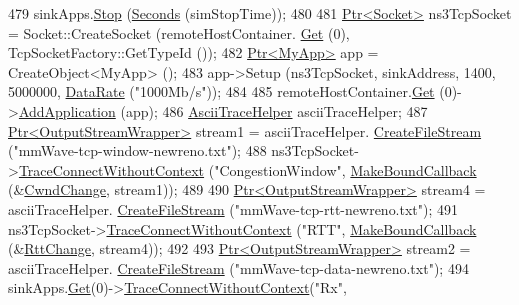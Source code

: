 \begin{DoxyCode}
479         sinkApps.\hyperlink{classns3_1_1ApplicationContainer_adfc52f9aa4020c8714679b00bbb9ddb3}{Stop} (\hyperlink{group__timecivil_ga33c34b816f8ff6628e33d5c8e9713b9e}{Seconds} (simStopTime));
480 
481         \hyperlink{classns3_1_1Ptr}{Ptr<Socket>} ns3TcpSocket = Socket::CreateSocket (remoteHostContainer.
      \hyperlink{classns3_1_1NodeContainer_a9ed96e2ecc22e0f5a3d4842eb9bf90bf}{Get} (0), TcpSocketFactory::GetTypeId ());
482         \hyperlink{classns3_1_1Ptr}{Ptr<MyApp>} app = CreateObject<MyApp> ();
483         app->Setup (ns3TcpSocket, sinkAddress, 1400, 5000000, \hyperlink{classns3_1_1DataRate}{DataRate} (\textcolor{stringliteral}{"1000Mb/s"}));
484 
485         remoteHostContainer.\hyperlink{classns3_1_1NodeContainer_a9ed96e2ecc22e0f5a3d4842eb9bf90bf}{Get} (0)->\hyperlink{classns3_1_1Node_ab98b4fdc4aadc86366b80e8a79a53f47}{AddApplication} (app);
486         \hyperlink{classns3_1_1AsciiTraceHelper}{AsciiTraceHelper} asciiTraceHelper;
487         \hyperlink{classns3_1_1Ptr}{Ptr<OutputStreamWrapper>} stream1 = asciiTraceHelper.
      \hyperlink{classns3_1_1AsciiTraceHelper_a44960bf2ca32835024eaedd26d1c4f94}{CreateFileStream} (\textcolor{stringliteral}{"mmWave-tcp-window-newreno.txt"});
488         ns3TcpSocket->\hyperlink{classns3_1_1ObjectBase_a1be45f6fd561e75dcac9dfa81b2b81e4}{TraceConnectWithoutContext} (\textcolor{stringliteral}{"CongestionWindow"}, 
      \hyperlink{group__makeboundcallback_ga1725d6362e6065faa0709f7c93f8d770}{MakeBoundCallback} (&\hyperlink{mmwave-tcp-building-example_8cc_a029700a26394b63e7e4f8fe0dc2a3e0d}{CwndChange}, stream1));
489 
490         \hyperlink{classns3_1_1Ptr}{Ptr<OutputStreamWrapper>} stream4 = asciiTraceHelper.
      \hyperlink{classns3_1_1AsciiTraceHelper_a44960bf2ca32835024eaedd26d1c4f94}{CreateFileStream} (\textcolor{stringliteral}{"mmWave-tcp-rtt-newreno.txt"});
491         ns3TcpSocket->\hyperlink{classns3_1_1ObjectBase_a1be45f6fd561e75dcac9dfa81b2b81e4}{TraceConnectWithoutContext} (\textcolor{stringliteral}{"RTT"}, 
      \hyperlink{group__makeboundcallback_ga1725d6362e6065faa0709f7c93f8d770}{MakeBoundCallback} (&\hyperlink{mmwave-tcp-building-example_8cc_a9490f3a2b4f07bb82ec1024befcb57a8}{RttChange}, stream4));
492 
493         \hyperlink{classns3_1_1Ptr}{Ptr<OutputStreamWrapper>} stream2 = asciiTraceHelper.
      \hyperlink{classns3_1_1AsciiTraceHelper_a44960bf2ca32835024eaedd26d1c4f94}{CreateFileStream} (\textcolor{stringliteral}{"mmWave-tcp-data-newreno.txt"});
494         sinkApps.\hyperlink{classns3_1_1ApplicationContainer_a9e565807abd4213a56566a7ccd8d7509}{Get}(0)->\hyperlink{classns3_1_1ObjectBase_a1be45f6fd561e75dcac9dfa81b2b81e4}{TraceConnectWithoutContext}(\textcolor{stringliteral}{"Rx"},

\end{DoxyCode}
